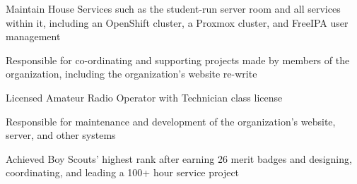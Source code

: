 \medskip


\medskip


\smallskip
\smallskip


\medskip
{}

Maintain House Services such as the student-run server room and all services within it, including an OpenShift cluster, a Proxmox cluster, and FreeIPA user management


Responsible for co-ordinating and supporting projects made by members of the organization, including the organization's website re-write


Licensed Amateur Radio Operator with Technician class license


Responsible for maintenance and development of the organization's website, server, and other systems



Achieved Boy Scouts' highest rank after earning 26 merit badges and designing, coordinating, and leading a 100+ hour service project




